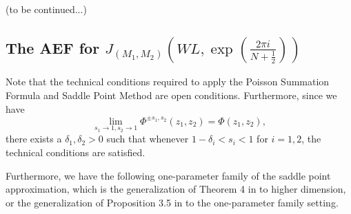 \documentclass[10pt,a4paper]{article}
\def \CC{\mathbb C}
\def\CC{{\mathbb C}}
\def\RR{{\mathbb R}}
\begin{document}
(to be continued...)
\fi

\iffalse
\subsection{The AEF for $J_{(M_1,M_2)}(WL, \exp(\frac{2\pi i}{N+\frac{1}{2}}))$}
Note that the technical conditions required to apply the Poisson Summation Formula and Saddle Point Method are open conditions. Furthermore, since we have 
$$ \lim_{s_1\to 1, s_2 \to 1} \Phi^{\pm s_1, s_2} (z_1, z_2) = \Phi(z_1,z_2),$$
there exists a $\delta_1, \delta_2 > 0$ such that whenever $1-\delta_i < s_i < 1$ for $i=1,2$, the technical conditions are satisfied. 

Furthermore, we have the following one-parameter family of the saddle point approximation, which is the generalization of Theorem 4 in \cite{WA17} to higher dimension, or the generalization of Proposition 3.5 in \cite{O52} to the one-parameter family setting.
 
\end{document}
